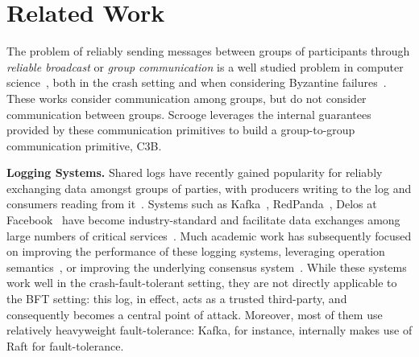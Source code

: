 \section{Related Work}

The problem of reliably sending messages between groups of participants through \textit{reliable broadcast} or \textit{group communication}
is a well studied problem in computer science~\cite{fault-tolerant-broadcast,reliable-birman,bracha-toueg-ba,sintra,diffusion-byzantine-env,broadcast-survey,hadzilacos-thesis,delta-reliable-broadcast}, both in the crash setting and when considering Byzantine failures~\cite{random-ba,bracha-ba,bracha-toueg-ba,sintra,good-byzantine-broadcast,synchronous-ba-ittai}. These works consider communication among groups, but do not consider communication between groups. Scrooge leverages the internal guarantees provided by these communication primitives to build a group-to-group communication primitive, C3B.

\par \textbf{Logging Systems.} Shared logs have recently gained popularity for reliably exchanging data amongst groups of parties, with producers writing to the log and consumers reading from it~\cite{kreps2011kafka,kalia2016design,jia2021boki,cao2018polarfs,balakrishnan2013tango,wang2015building,venkataraman2017drizzle}. Systems such as Kafka~\cite{kreps2011kafka}, RedPanda~\cite{redpanda}, Delos at Facebook~\cite{delos} have become industry-standard and facilitate data exchanges among large numbers of critical services~\cite{delos}. Much academic work has subsequently focused on improving the performance of these logging systems, leveraging operation semantics~\cite{fuzzylog,wang2015building,balakrishnan2013tango}, or improving the underlying consensus system~\cite{scalog}. 
While these systems work well in the crash-fault-tolerant setting, they are not directly applicable to the BFT setting: this log, in effect, acts as a trusted third-party, and consequently becomes a central point of attack. Moreover, most of them use relatively heavyweight fault-tolerance: Kafka, for instance, internally makes use of Raft for fault-tolerance.


